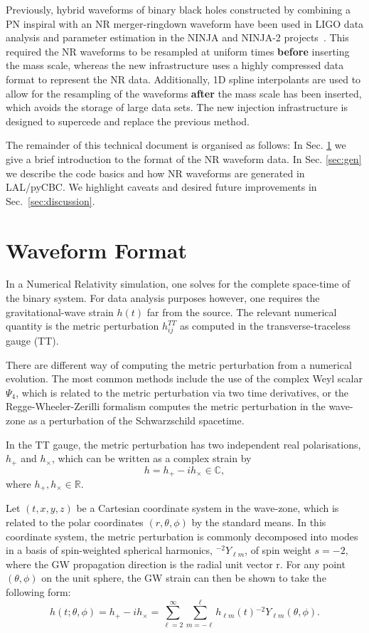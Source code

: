\documentclass[aps,prd,amssymb,amsmath,amsfonts,superscriptaddress,
floatfix ,preprintnumbers,altaffilletter]{revtex4}
\begin{document}
Previously, hybrid waveforms of binary black holes constructed by combining a PN inspiral with an NR merger-ringdown 
waveform have been
used in LIGO data analysis and parameter estimation in the NINJA and NINJA-2 projects~\cite{Aylott:2009ya, Aasi:2014tra}.
This required the
NR waveforms to be resampled at uniform times \textbf{before} inserting the mass scale, whereas the new infrastructure uses a highly
compressed data format to represent the NR data. Additionally, 1D spline interpolants are used to allow for the resampling
of the waveforms \textbf{after} the mass scale has been inserted, which avoids the storage of large data sets.
The new injection infrastructure is designed to supercede and replace the previous method.

The remainder of this technical document is organised as follows: In Sec. \ref{sec:format} we give a brief introduction
to the format of the NR waveform data. In Sec. \ref{sec:gen} we describe the code basics and how NR waveforms
are generated in LAL/pyCBC. We highlight caveats and desired future improvements in Sec.~\ref{sec:discussion}.

\section{Waveform Format}
\label{sec:format}
In a Numerical Relativity simulation, one solves for the complete space-time of the binary system. For data analysis
purposes however, one requires the gravitational-wave strain $h(t)$ far from the source. The relevant numerical quantity
is the metric perturbation $h^{TT}_{ij}$ as computed in the transverse-traceless gauge (TT). 

There are different way of computing the metric perturbation from a numerical evolution. The most common methods include
the use of the complex Weyl scalar $\Psi_4$, which is related to the metric perturbation via two time derivatives, or the
Regge-Wheeler-Zerilli formalism computes the metric perturbation in the wave-zone as a perturbation of the Schwarzschild
spacetime. 

In the TT gauge, the metric perturbation
has two independent real polarisations, $h_+$ and $h_\times$, which can be written as a complex strain by
\begin{equation}
\label{ }
h = h_+ - i h_\times \in \mathbb{C},
\end{equation}
where $h_+, h_\times \in \mathbb{R}$.

Let $(t,x,y,z)$ be a Cartesian coordinate system in the wave-zone, which is related to the polar coordinates $(r, \theta, \phi)$ by the standard means. 
In this coordinate system, the metric perturbation is commonly decomposed into modes
in a basis of spin-weighted spherical harmonics, ${}^{-2}Y_{\ell m}$, of spin weight $s=-2$, where the GW propagation direction is
the radial unit vector r.
For any point $(\theta, \phi)$ on the unit sphere, the GW strain can then be shown to take the following form:
\begin{equation}
\label{ }
h(t; \theta, \phi) = h_+ - i h_\times = \sum_{\ell=2}^\infty \sum_{m=-\ell}^{\ell} h_{\ell m}(t) {}^{-2}Y_{\ell m}(\theta,\phi).
\end{equation}
\end{document}
